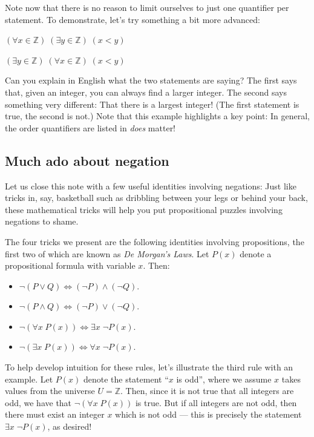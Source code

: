 \documentclass[11pt]{article}
\begin{document}

Note now that there is no reason to limit ourselves to just one quantifier per statement. To demonstrate, let's try something a bit more advanced:
\begin{compactenum}
\item $(\forall x \in \mathbb{Z})\;(\exists y \in \mathbb{Z})\;( x < y)$
\item $(\exists y \in \mathbb{Z})\;( \forall x \in \mathbb{Z})\;(x < y)$
\end{compactenum}
Can you explain in English what the two statements are saying? The first says that, given an integer, you can always find a larger integer. The second says something very different: That there is a largest integer! (The first statement is true, the second is not.) Note that this example highlights a key point: In general, the order quantifiers are listed in \emph{does} matter!

\subsection{Much ado about negation}\label{sscn:negation}

Let us close this note with a few useful identities involving negations: Just like tricks in, say, basketball such as dribbling between your legs or behind your back, these mathematical tricks will help you put propositional puzzles involving negations to shame.

The four tricks we present are the following identities involving propositions, the first two of which are known as \emph{De Morgan's Laws}. Let $P(x)$ denote a propositional formula with variable $x$. Then:
\begin{itemize}
    \item $\neg(P\vee Q) \iff (\neg P)\wedge (\neg Q)$.
    \item $\neg(P\wedge Q) \iff (\neg P)\vee (\neg Q)$.
    \item $\neg (\forall x\; P(x)) \iff \exists x \;\lnot P(x)$.
    \item $\neg (\exists x\; P(x)) \iff \forall x \;\neg P(x)$.
\end{itemize}
To help develop intuition for these rules, let's illustrate the third rule with an example. Let $P(x)$ denote the statement ``$x$ is odd'', where we assume $x$ takes values from the universe $U=\mathbb{Z}$. Then, since it is not true that all integers are odd, we have that $\lnot (\forall x\; P(x))$ is true. But if all integers are not odd, then there must exist an integer $x$ which is not odd --- this is precisely the statement $\exists x \;\lnot P(x)$, as desired!
\end{document}
